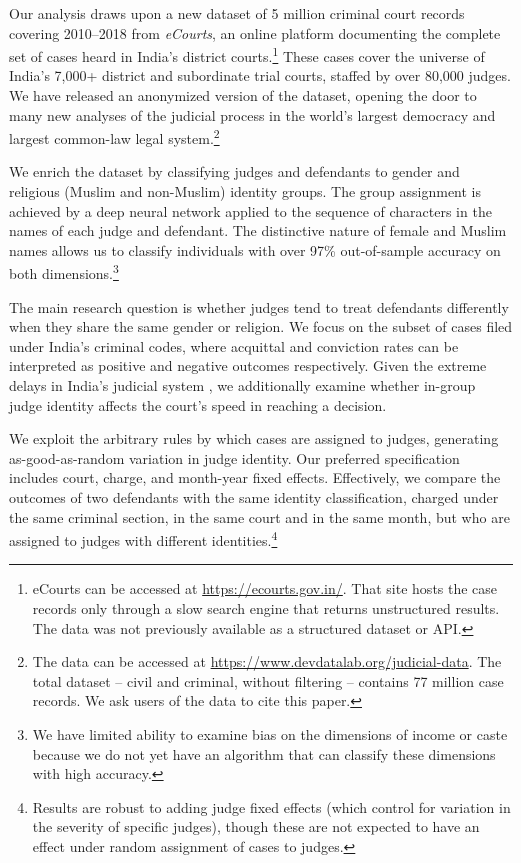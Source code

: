 \documentclass[12pt,english]{article}
\begin{document}
Our analysis draws upon a new dataset of 5 million criminal court records covering 2010--2018 from \textit{eCourts}, an online platform documenting the complete set of cases heard in India's district courts.\footnote{eCourts can be accessed at \url{https://ecourts.gov.in/}. That site hosts the case records only through a slow search engine that returns unstructured results. The data was not previously available as a structured dataset or API. } These cases cover the universe of India's 7,000+ district and subordinate trial courts, staffed by over 80,000 judges. We have released an anonymized version of the dataset, opening the door to many new analyses of the judicial process in the world's largest democracy and largest common-law legal system.\footnote{The data can be accessed at \url{https://www.devdatalab.org/judicial-data}. The total dataset -- civil and criminal, without filtering -- contains 77 million case records. We ask users of the data to cite this paper.}

We enrich the dataset by classifying judges and defendants to gender and religious (Muslim and non-Muslim) identity groups. The group assignment is achieved by  a deep neural network applied to the sequence of characters in the names of each judge and defendant. The distinctive nature of female and Muslim names allows us to classify individuals with over 97\% out-of-sample accuracy on both dimensions.\footnote{We have limited ability to examine bias on the dimensions of income or caste because we do not yet have an algorithm that can classify these dimensions with high accuracy.} 

The main research question is whether judges tend to treat defendants differently when they share the same gender or religion.  We focus on the subset of cases filed under India's criminal codes, where acquittal and conviction rates can be interpreted as positive and negative outcomes respectively. Given the extreme delays in India's judicial system \citep{trusts2019india, rao2019judges}, we additionally examine whether in-group judge identity affects the court's speed in reaching a decision.

We exploit the arbitrary rules by which cases are assigned to judges, generating as-good-as-random variation in judge identity. Our preferred specification includes court, charge, and month-year fixed effects. Effectively, we compare the outcomes of two defendants with the same identity classification, charged under the same criminal section, in the same court and in the same month, but who are assigned to judges with different identities.\footnote{Results are robust to adding judge fixed effects (which control for variation in the severity of specific judges), though these are not expected to have an effect under random assignment of cases to judges.}
\end{document}
